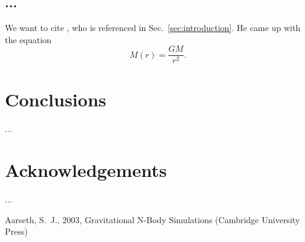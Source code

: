 \documentclass[english, apj]{emulateapj}
\begin{document}
\subsection{...}
We want to cite \citet{Aarseth03}, who is referenced in Sec.~\ref{sec:introduction}. He came up with the equation
\begin{equation}
M(r) = \frac{GM}{r^2}.
\end{equation}


\section{Conclusions}\label{sec:conclusions}

...




\section*{Acknowledgements}

...




\begin{thebibliography}{}

Aarseth, S.~J., 2003, Gravitational N-Body Simulations (Cambridge University Press)


\end{thebibliography}
\end{document}
